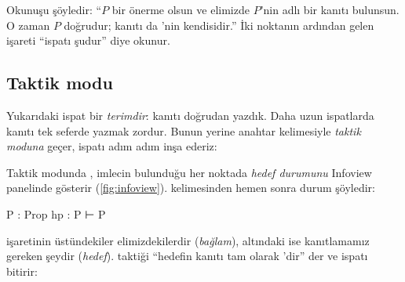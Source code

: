 Okunuşu şöyledir: ``$P$ bir önerme olsun ve elimizde $P$'nin  adlı
bir kanıtı bulunsun. O zaman $P$ doğrudur; kanıtı da 'nin
kendisidir.'' İki noktanın ardından gelen \lc{:=} işareti ``ispatı şudur''
diye okunur.

\subsection{Taktik modu}

Yukarıdaki ispat bir \emph{terimdir}: kanıtı doğrudan yazdık. Daha uzun
ispatlarda kanıtı tek seferde yazmak zordur. Bunun yerine 
anahtar kelimesiyle \emph{taktik moduna} geçer, ispatı adım adım inşa
ederiz:


Taktik modunda \Lean{}, imlecin bulunduğu her noktada \emph{hedef durumunu}
Infoview panelinde gösterir (\cref{fig:infoview}).  kelimesinden
hemen sonra durum şöyledir:

\begin{hedefdurumu}
P : Prop
hp : P
⊢ P
\end{hedefdurumu}

\noindent {} işaretinin üstündekiler elimizdekilerdir (\emph{bağlam}),
altındaki ise kanıtlamamız gereken şeydir (\emph{hedef}). 
taktiği ``hedefin kanıtı tam olarak 'dir'' der ve ispatı bitirir:

\ispatbitti

